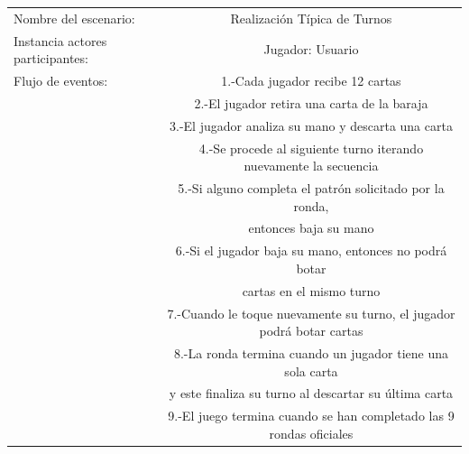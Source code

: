 \documentclass[60pt]{article}
\begin{document}
\begin{center}
    \begin{tabular}{ l | c  }
        Nombre del escenario:            & Realización Típica de Turnos                                          \\
        Instancia actores participantes: & Jugador: Usuario                                                      \\\hline
        Flujo de eventos:                & 1.-Cada jugador recibe 12 cartas                                      \\
                                         & 2.-El jugador retira una carta de la   baraja                         \\   
                                         & 3.-El jugador analiza su mano y descarta una carta                    \\  
                                         & 4.-Se procede al siguiente turno iterando nuevamente la secuencia     \\
                                         & 5.-Si alguno completa el   patrón solicitado por la ronda,            \\
                                         & entonces baja su mano                                                 \\
                                         & 6.-Si el jugador baja su mano, entonces no podrá botar                \\
                                         & cartas en el mismo turno                                              \\
                                         & 7.-Cuando le toque nuevamente su turno, el jugador podrá botar cartas \\
                                         & 8.-La ronda termina cuando un jugador tiene una sola carta            \\
                                         & y este finaliza su turno al descartar su última carta                 \\
                                         & 9.-El juego termina cuando se han completado las 9 rondas oficiales   \\
        \hline
    \end{tabular}
\end{center}
\end{document}
